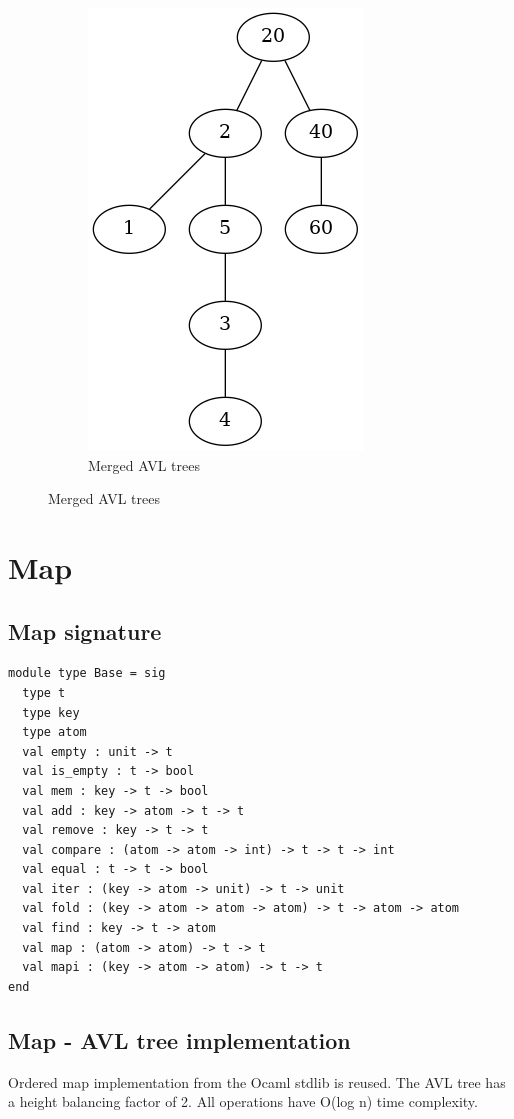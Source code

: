 \documentclass{article}
\begin{document}
\begin{figure}[H]
  \begin{subfigure}{\linewidth}
  \begin{center}
  \includegraphics[height=.3\textheight,keepaspectratio]{set-avl-merged.png}
  \end{center}
  \caption{Merged AVL trees}
  \end{subfigure}
\end{figure}

\newpage
\section{Map}
\subsection{Map signature}
\begin{lstlisting}
module type Base = sig
  type t
  type key
  type atom
  val empty : unit -> t
  val is_empty : t -> bool
  val mem : key -> t -> bool
  val add : key -> atom -> t -> t
  val remove : key -> t -> t
  val compare : (atom -> atom -> int) -> t -> t -> int
  val equal : t -> t -> bool
  val iter : (key -> atom -> unit) -> t -> unit
  val fold : (key -> atom -> atom -> atom) -> t -> atom -> atom
  val find : key -> t -> atom
  val map : (atom -> atom) -> t -> t
  val mapi : (key -> atom -> atom) -> t -> t
end
\end{lstlisting}

\subsection{Map - AVL tree implementation}
Ordered map implementation from the Ocaml stdlib is reused. The AVL tree has a height balancing factor of 2. All operations have O(log n) time complexity.
\end{document}
